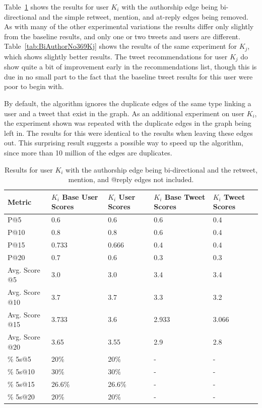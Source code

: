 Table~\ref{tab:BiAuthorNo369Ki} shows the results for user $K_{i}$ with the authorship edge being bi-directional and the simple retweet, mention, and at-reply edges being removed. As with many of the other experimental variations the results differ only slightly from the baseline results, and only one or two tweets and users are different. Table~\ref{tab:BiAuthorNo369Kj} shows the results of the same experiment for $K_{j}$, which shows slightly better results. The tweet recommendations for user $K_{j}$ do show quite a bit of improvement early in the recommendations list, though this is due in no small part to the fact that the baseline tweet results for this user were poor to begin with.

By default, the algorithm ignores the duplicate edges of the same type linking a user and a tweet that exist in the graph. As an additional experiment on user $K_{i}$, the experiment shown was repeated with the duplicate edges in the graph being left in. The results for this were identical to the results when leaving these edges out. This surprising result suggests a possible way to speed up the algorithm, since more than 10 million of the edges are duplicates.


\begin{table}
\centering
\begin{tabular}{l|p{2.2cm}|p{2.2cm}|p{2.2cm}|p{2.2cm}}
{\bf Metric} & {\bf $K_{i}$ Base User Scores} & {\bf $K_{i}$ User Scores} & {\bf $K_{i}$ Base Tweet Scores} & {\bf $K_{i}$ Tweet Scores} \\ \hline
P@5   & 0.6 & 0.6 & 0.6 & 0.4 \\ \hline
P@10 & 0.8 & 0.8 & 0.6 & 0.4 \\ \hline
P@15 & 0.733 & 0.666 & 0.4 & 0.4 \\ \hline
P@20 & 0.7 & 0.6 & 0.3 & 0.3 \\ \hline

Avg. Score @5   & 3.0 & 3.0 & 3.4 & 3.4 \\ \hline
Avg. Score @10 & 3.7 & 3.7 & 3.3 & 3.2 \\ \hline
Avg. Score @15 & 3.733 & 3.6 & 2.933 & 3.066 \\ \hline
Avg. Score @20 & 3.65 & 3.55 & 2.9 & 2.8 \\ \hline

\% 5s@5    & 20\% & 20\% & - & - \\ \hline
\% 5s@10  & 30\% & 30\% & - & - \\ \hline
\% 5s@15  & 26.6\% & 26.6\% & - & - \\ \hline
\% 5s@20  & 20\% & 20\% & - & - \\
\end{tabular}
\caption{Results for user $K_{i}$ with the authorship edge being bi-directional and the retweet, mention, and @reply edges not included.}
\label{tab:BiAuthorNo369Ki}
\end{table}


